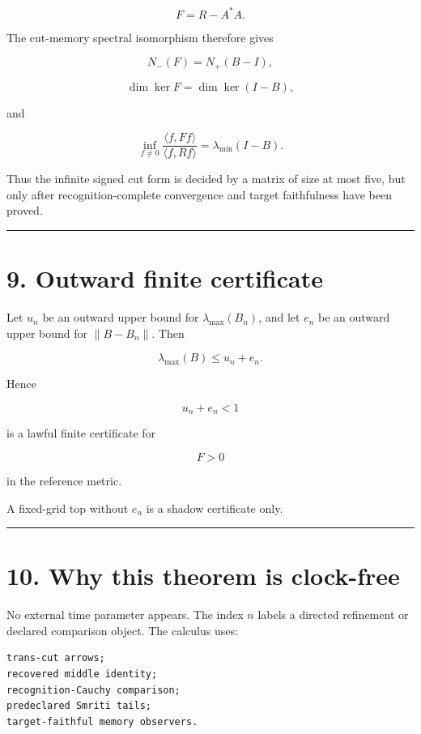 \[
F=R-A^*A.
\]

The cut-memory spectral isomorphism therefore gives

\[
\boxed{
N_-(F)=N_+(B-I),
}
\]

\[
\boxed{
\dim\ker F=\dim\ker(I-B),
}
\]

and

\[
\boxed{
\inf_{f\ne0}
\frac{\langle f,Ff\rangle}{\langle f,Rf\rangle}
=
\lambda_{\min}(I-B).
}
\]

Thus the infinite signed cut form is decided by a matrix of size at most five,
but only after recognition-complete convergence and target faithfulness have
been proved.

\begin{center}\rule{0.5\linewidth}{0.5pt}\end{center}

\hypertarget{outward-finite-certificate}{%
\section{9. Outward finite certificate}\label{outward-finite-certificate}}

Let \(u_n\) be an outward upper bound for \(\lambda_{\max}(B_n)\), and let
\(e_n\) be an outward upper bound for \(\|B-B_n\|\). Then

\[
\lambda_{\max}(B)
\le u_n+e_n.
\]

Hence

\[
\boxed{
u_n+e_n<1}
\]

is a lawful finite certificate for

\[
F>0
\]

in the reference metric.

A fixed-grid top without \(e_n\) is a shadow certificate only.

\begin{center}\rule{0.5\linewidth}{0.5pt}\end{center}

\hypertarget{why-this-theorem-is-clock-free}{%
\section{10. Why this theorem is clock-free}\label{why-this-theorem-is-clock-free}}

No external time parameter appears. The index \(n\) labels a directed
refinement or declared comparison object. The calculus uses:

\begin{verbatim}
trans-cut arrows;
recovered middle identity;
recognition-Cauchy comparison;
predeclared Smriti tails;
target-faithful memory observers.
\end{verbatim}

